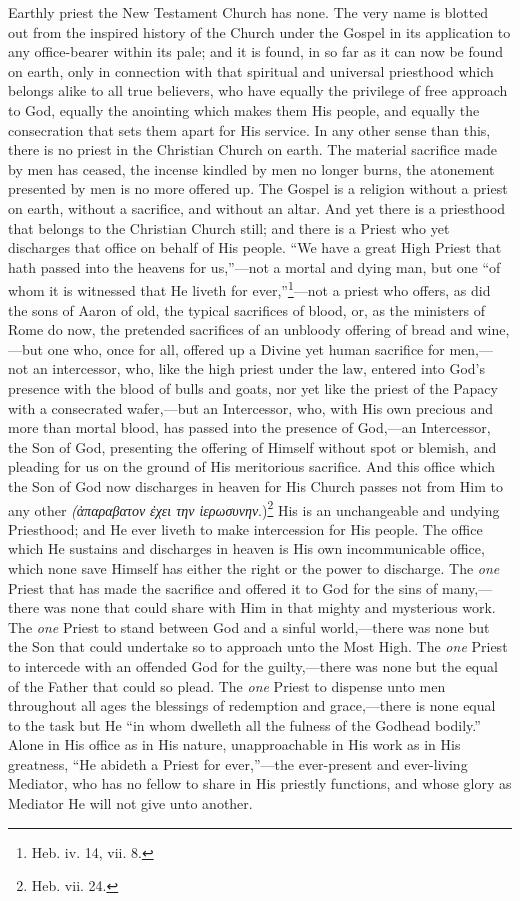 \documentclass[english,]{book}
\begin{document}
Earthly priest the New Testament Church has none. The very name is blotted out from the inspired history of the Church under the Gospel in its application to any office-bearer within its pale; and it is found, in so far as it can now be found on earth, only in connection with that spiritual and universal priesthood which belongs alike to all true believers, who have equally the privilege of free approach to God, equally the anointing which makes them His people, and equally the consecration that sets them apart for His service. In any other sense than this, there is no priest in the Christian Church on earth. The material sacrifice made by men has ceased, the incense kindled by men no longer burns, the atonement presented by men is no more offered up. The Gospel is a religion without a priest on earth, without a sacrifice, and without an altar. And yet there is a priesthood that belongs to the Christian Church still; and there is a Priest who yet discharges that office on behalf of His people. ``We have a great High Priest that hath passed into the heavens for us,''---not a mortal and dying man, but one ``of whom it is witnessed that He liveth for ever,''\footnote{Heb. iv. 14, vii. 8.}---not a priest who offers, as did the sons of Aaron of old, the typical sacrifices of blood, or, as the ministers of Rome do now, the pretended sacrifices of an unbloody offering of bread and wine,---but one who, once for all, offered up a Divine yet human sacrifice for men,---not an intercessor, who, like the high priest under the law, entered into God's presence with the blood of bulls and goats, nor yet like the priest of the Papacy with a consecrated wafer,---but an Intercessor, who, with His own precious and more than mortal blood, has passed into the presence of God,---an Intercessor, the Son of God, presenting the offering of Himself without spot or blemish, and pleading for us on the ground of His meritorious sacrifice. And this office which the Son of God now discharges in heaven for His Church passes not from Him to any other \emph{(ἀπαραβατον ἐχει την ἱερωσυνην}.)\footnote{Heb. vii. 24.} His is an unchangeable and undying Priesthood; and He ever liveth to make intercession for His people. The office which He sustains and discharges in heaven is His own incommunicable office, which none save Himself has either the right or the power to discharge. The \emph{one} Priest that has made the sacrifice and offered it to God for the sins of many,---there was none that could share with Him in that mighty and mysterious work. The \emph{one} Priest to stand between God and a sinful world,---there was none but the Son that could undertake so to approach unto the Most High. The \emph{one} Priest to intercede with an offended God for the guilty,---there was none but the equal of the Father that could so plead. The \emph{one} Priest to dispense unto men throughout all ages the blessings of redemption and grace,---there is none equal to the task but He ``in whom dwelleth all the fulness of the Godhead bodily.'' Alone in His office as in His nature, unapproachable in His work as in His greatness, ``He abideth a Priest for ever,''---the ever-present and ever-living Mediator, who has no fellow to share in His priestly functions, and whose glory as Mediator He will not give unto another.
\end{document}
